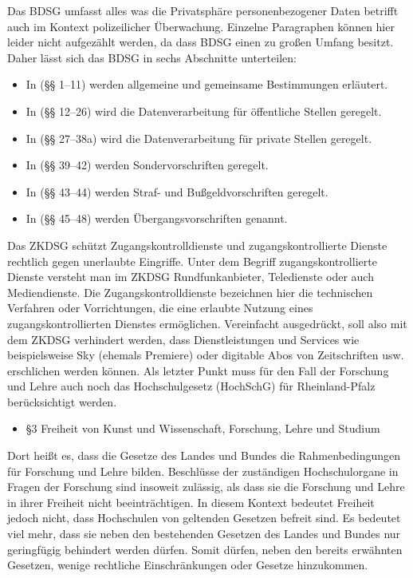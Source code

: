 \documentclass[10pt,a4paper]{article}
\begin{document}
Das BDSG umfasst alles was die Privatsphäre personenbezogener Daten betrifft auch im Kontext polizeilicher Überwachung. Einzelne Paragraphen können hier leider nicht aufgezählt werden, da dass BDSG einen zu großen Umfang besitzt. Daher lässt sich das BDSG in sechs Abschnitte unterteilen:
\begin{itemize}
	\item In (§§ 1–11) werden allgemeine und gemeinsame Bestimmungen erläutert.
	\item In (§§ 12–26) wird die Datenverarbeitung für öffentliche Stellen geregelt.
	\item In (§§ 27–38a) wird die Datenverarbeitung für private Stellen geregelt.
	\item In (§§ 39–42) werden Sondervorschriften geregelt.
	\item In (§§ 43–44) werden Straf- und Bußgeldvorschriften geregelt.
	\item In (§§ 45–48) werden Übergangsvorschriften genannt.
\end{itemize}
Das ZKDSG schützt Zugangskontrolldienste und zugangskontrollierte Dienste rechtlich gegen unerlaubte Eingriffe. Unter dem Begriff zugangskontrollierte Dienste versteht man im ZKDSG Rundfunkanbieter, Teledienste oder auch Mediendienste. Die Zugangskontrolldienste bezeichnen hier die technischen Verfahren oder Vorrichtungen, die eine erlaubte Nutzung eines zugangskontrollierten Dienstes ermöglichen. Vereinfacht ausgedrückt, soll also mit dem ZKDSG verhindert werden, dass Dienstleistungen und Services wie beispielsweise Sky (ehemals Premiere) oder digitable Abos von Zeitschriften usw. erschlichen werden können. 
Als letzter Punkt muss für den Fall der Forschung und Lehre auch noch das Hochschulgesetz (HochSchG) für Rheinland-Pfalz berücksichtigt werden.
\begin{itemize}
	\item §3 Freiheit von Kunst und Wissenschaft, Forschung, Lehre und Studium
\end{itemize}
Dort heißt es, dass die Gesetze des Landes und Bundes die Rahmenbedingungen für Forschung und Lehre bilden. Beschlüsse der zuständigen Hochschulorgane in Fragen der Forschung sind insoweit zulässig, als dass sie die Forschung und Lehre in ihrer Freiheit nicht beeinträchtigen. In diesem Kontext bedeutet Freiheit jedoch nicht, dass Hochschulen von geltenden Gesetzen befreit sind. Es bedeutet viel mehr, dass sie neben den bestehenden Gesetzen des Landes und Bundes nur geringfügig behindert werden dürfen. Somit dürfen, neben den bereits erwähnten Gesetzen, wenige rechtliche Einschränkungen oder Gesetze hinzukommen.
\end{document}
